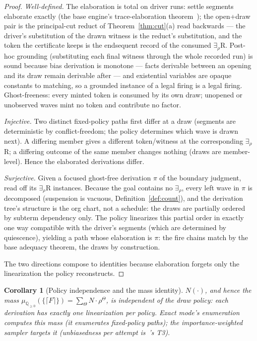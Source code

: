 \documentclass[11pt]{article}
\newcommand{\laxb}[1]{\{#1\}}                   %
\newcommand{\QQ}{\mathbb{Q}}                     %
\newcommand{\enc}[1]{\lceil #1 \rceil}          %
\newcommand{\Tr}{\Theta}                           %
\newtheorem{corollary}[theorem]{Corollary}
\theoremstyle{definition}
\theoremstyle{remark}
\begin{document}
\begin{proof}
\emph{Well-defined.}  The elaboration is total on driver runs: settle
segments elaborate exactly (the base engine's trace-elaboration
theorem~\cite{TillPaper}); the open+draw pair is the principal-cut
reduct of Theorem~\ref{thm:cut}(a) read backwards --- the driver's
substitution of the drawn witness is the reduct's substitution, and
the token the certificate keeps is the endsequent record of the
consumed $\exists_\rho$R.  Post-hoc grounding (substituting each final
witness through the whole recorded run) is sound because bias
derivation is monotone --- facts derivable between an opening and its
draw remain derivable after --- and existential variables are opaque
constants to matching, so a grounded instance of a legal firing is a
legal firing.  Ghost-freeness: every minted token is consumed by its
own draw; unopened or unobserved waves mint no token and contribute no
factor.

\emph{Injective.}  Two distinct fixed-policy paths first differ at a
draw (segments are deterministic by conflict-freedom; the policy
determines which wave is drawn next).  A differing member gives a
different token/witness at the corresponding $\exists_\rho$R; a
differing outcome of the same member changes nothing (draws are
member-level).  Hence the elaborated derivations differ.

\emph{Surjective.}  Given a focused ghost-free derivation $\pi$ of the
boundary judgment, read off its $\exists_\rho$R instances.  Because
the goal contains no $\exists_\rho$, every left wave in $\pi$ is
decomposed (suspension is vacuous, Definition~\ref{def:count}), and
the derivation tree's structure is the org chart, not a schedule: the
draws are partially ordered by subterm dependency only.  The policy
linearizes this partial order in exactly one way compatible with the
driver's segments (which are determined by quiescence), yielding a
path whose elaboration is $\pi$: the fire chains match by the base
adequacy theorem, the draws by construction.

The two directions compose to identities because elaboration forgets
only the linearization the policy reconstructs.
\end{proof}

\begin{corollary}[Policy independence and the mass identity]
\label{cor:mass}
$N(\cdot)$, and hence the mass
$\mu_{\QQ_{\geq0}}(\laxb{\enc F}) = \sum_\Tr N\cdot\rho^\Tr$, is
independent of the draw policy: each derivation has exactly one
linearization per policy.  Exact mode's enumeration computes this mass
(it enumerates fixed-policy paths); the importance-weighted sampler
targets it (unbiasedness per attempt is~\cite{THY0026}'s T3).
\end{corollary}
\end{document}
